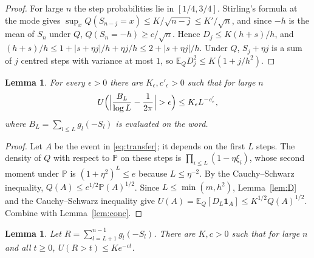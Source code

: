 \documentclass[11pt]{amsart}
\newtheorem{lemma}[theorem]{Lemma}
\theoremstyle{remark}
\numberwithin{equation}{section}
\newcommand{\PP}{\mathbb{P}}
\newcommand{\EE}{\mathbb{E}}
\begin{document}
\begin{proof}
For large $n$ the step probabilities lie in $[1/4,3/4]$. Stirling's formula at the mode gives $\sup_xQ(S_{n-j}=x)\le K/\sqrt{n-j}\le K'/\sqrt n$, and since $-h$ is the mean of $S_n$ under $Q$, $Q(S_n=-h)\ge c/\sqrt n$. Hence $D_j\le K(h+s)/h$, and $(h+s)/h\le1+|s+\eta j|/h+\eta j/h\le2+|s+\eta j|/h$. Under $Q$, $S_j+\eta j$ is a sum of $j$ centred steps with variance at most $1$, so $\EE_QD_j^2\le K(1+j/h^2)$.
\end{proof}

\begin{lemma}\label{lem:transfer}
For every $\epsilon>0$ there are $K_\epsilon,c'_\epsilon>0$ such that for large $n$
\begin{equation}\label{eq:transfer}
U\Bigl(\Bigl|\frac{B_L}{\log L}-\frac1{2\pi}\Bigr|>\epsilon\Bigr)\le K_\epsilon L^{-c'_\epsilon},
\end{equation}
where $B_L=\sum_{l\le L}g_l(-S_l)$ is evaluated on the word.
\end{lemma}

\begin{proof}
Let $A$ be the event in \eqref{eq:transfer}; it depends on the first $L$ steps. The density of $Q$ with respect to $\PP$ on these steps is $\prod_{i\le L}(1-\eta\xi_i)$, whose second moment under $\PP$ is $(1+\eta^2)^L\le e$ because $L\le\eta^{-2}$. By the Cauchy--Schwarz inequality, $Q(A)\le e^{1/2}\PP(A)^{1/2}$. Since $L\le\min(m,h^2)$, Lemma~\ref{lem:D} and the Cauchy--Schwarz inequality give $U(A)=\EE_Q[D_L\mathbf 1_A]\le K^{1/2}Q(A)^{1/2}$. Combine with Lemma~\ref{lem:conc}.
\end{proof}

\begin{lemma}\label{lem:tail}
Let $R=\sum_{l=L+1}^{n-1}g_l(-S_l)$. There are $K,c>0$ such that for large $n$ and all $t\ge0$, $U(R>t)\le Ke^{-ct}$.
\end{lemma}
\end{document}
